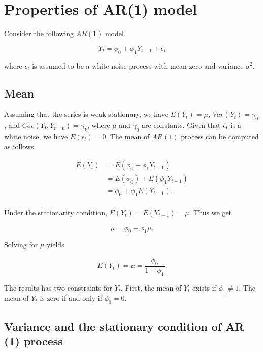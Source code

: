 \documentclass[
  11pt,
  a4paper,
]{report}
\begin{document}
\section{Properties of AR(1) model}\label{properties-of-ar1-model}

Consider the following \(AR(1)\) model.

\begin{equation}
Y_t=\phi_0+\phi_1Y_{t-1}+\epsilon_{t}
\end{equation}

where \({\epsilon_t}\) is assumed to be a white noise process with mean
zero and variance \(\sigma^2\).

\subsection{Mean}\label{mean}

Assuming that the series is weak stationary, we have \(E(Y_t)=\mu\),
\(Var(Y_t)=\gamma_0\), and \(Cov(Y_t, Y_{t-k})=\gamma_k\), where \(\mu\)
and \(\gamma_0\) are constants. Given that \({\epsilon_t}\) is a white
noise, we have \(E(\epsilon_t)=0\). The mean of \(AR(1)\) process can be
computed as follows:

\[
\begin{aligned}
  E(Y_t) &= E(\phi_0+\phi_1 Y_{t-1}) \\
         &= E(\phi_0) +E(\phi_1 Y_{t-1}) \\
         &= \phi_0 +\phi_1 E(Y_{t-1}). \\
\end{aligned}
\]

Under the stationarity condition, \(E(Y_t)=E(Y_{t-1})=\mu\). Thus we get

\[\mu = \phi_0+\phi_1\mu.\]

Solving for \(\mu\) yields

\begin{equation}
E(Y_t)=\mu=\frac{\phi_0}{1-\phi_1}.
\end{equation}

The results has two constraints for \(Y_t\). First, the mean of \(Y_t\)
exists if \(\phi_1 \neq 1 .\) The mean of \(Y_t\) is zero if and only if
\(\phi_0=0\).

\subsection{Variance and the stationary condition of AR (1)
process}\label{variance-and-the-stationary-condition-of-ar-1-process}
\end{document}
